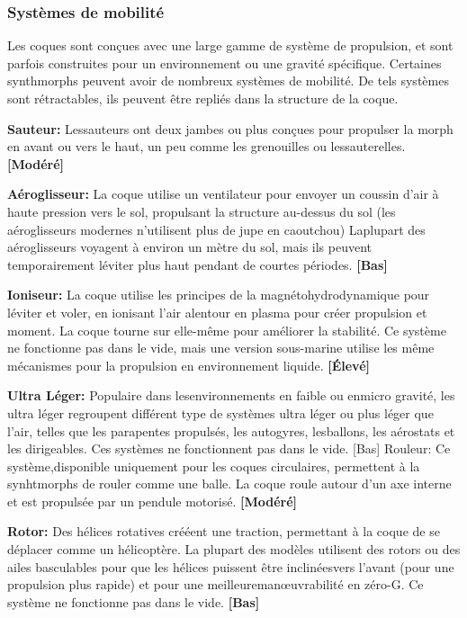 {{\subsubsection{Systèmes de mobilité} 

Les coques sont conçues avec une large gamme de système de propulsion, et sont parfois construites pour un environnement ou une gravité spécifique. Certaines synthmorphs peuvent avoir de nombreux systèmes de mobilité. De tels systèmes sont rétractables, ils peuvent être repliés dans la structure de la coque. 

\textbf{Sauteur:} Lessauteurs ont deux jambes ou plus conçues pour propulser la morph en avant ou vers le haut, un peu comme les grenouilles ou lessauterelles. \textbf{[Modéré]} 

\textbf{Aéroglisseur:} La coque utilise un ventilateur pour envoyer un coussin d'air à haute pression vers le sol, propulsant la structure au-dessus du sol (les aéroglisseurs modernes n'utilisent plus de jupe en caoutchou) Laplupart des aéroglisseurs voyagent à environ un mètre du sol, mais ils peuvent temporairement léviter plus haut pendant de courtes périodes. \textbf{[Bas]} 

\textbf{Ioniseur:} La coque utilise les principes de la magnétohydrodynamique pour léviter et voler, en ionisant l'air alentour en plasma pour créer propulsion et moment. La coque tourne sur elle-même pour améliorer la stabilité. Ce système ne fonctionne pas dans le vide, mais une version sous-marine utilise les même mécanismes pour la propulsion en environnement liquide. \textbf{[Élevé]} 

\textbf{Ultra Léger:} Populaire dans lesenvironnements en faible ou enmicro gravité, les ultra léger regroupent différent type de systèmes ultra léger ou plus léger que l'air, telles que les parapentes propulsés, les autogyres, lesballons, les aérostats et les dirigeables. Ces systèmes ne fonctionnent pas dans le vide. [Bas] Rouleur: Ce système,disponible uniquement pour les coques circulaires, permettent à la synhtmorphs de rouler comme une balle. La coque roule autour d'un axe interne et est propulsée par un pendule motorisé. \textbf{[Modéré]} 

\textbf{Rotor:} Des hélices rotatives crééent une traction, permettant à la coque de se déplacer comme un hélicoptère. La plupart des modèles utilisent des rotors ou des ailes basculables pour que les hélices puissent être inclinéesvers l'avant (pour une propulsion plus rapide) et pour une meilleuremanœuvrabilité en zéro-G. Ce système ne fonctionne pas dans le vide. \textbf{[Bas]} 

}}
